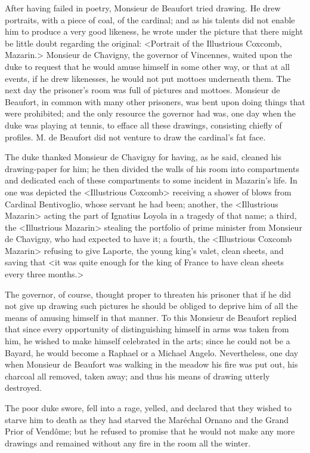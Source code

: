 After having failed in poetry, Monsieur de Beaufort tried drawing. He drew portraits, with a piece of coal, of the cardinal; and as his talents did not enable him to produce a very good likeness, he wrote under the picture that there might be little doubt regarding the original: <Portrait of the Illustrious Coxcomb, Mazarin.> Monsieur de Chavigny, the governor of Vincennes, waited upon the duke to request that he would amuse himself in some other way, or that at all events, if he drew likenesses, he would not put mottoes underneath them. The next day the prisoner's room was full of pictures and mottoes. Monsieur de Beaufort, in common with many other prisoners, was bent upon doing things that were prohibited; and the only resource the governor had was, one day when the duke was playing at tennis, to efface all these drawings, consisting chiefly of profiles. M. de Beaufort did not venture to draw the cardinal's fat face.

The duke thanked Monsieur de Chavigny for having, as he said, cleaned his drawing-paper for him; he then divided the walls of his room into compartments and dedicated each of these compartments to some incident in Mazarin's life. In one was depicted the <Illustrious Coxcomb> receiving a shower of blows from Cardinal Bentivoglio, whose servant he had been; another, the <Illustrious Mazarin> acting the part of Ignatius Loyola in a tragedy of that name; a third, the <Illustrious Mazarin> stealing the portfolio of prime minister from Monsieur de Chavigny, who had expected to have it; a fourth, the <Illustrious Coxcomb Mazarin> refusing to give Laporte, the young king's valet, clean sheets, and saving that <it was quite enough for the king of France to have clean sheets every three months.>

The governor, of course, thought proper to threaten his prisoner that if he did not give up drawing such pictures he should be obliged to deprive him of all the means of amusing himself in that manner. To this Monsieur de Beaufort replied that since every opportunity of distinguishing himself in arms was taken from him, he wished to make himself celebrated in the arts; since he could not be a Bayard, he would become a Raphael or a Michael Angelo. Nevertheless, one day when Monsieur de Beaufort was walking in the meadow his fire was put out, his charcoal all removed, taken away; and thus his means of drawing utterly destroyed.

The poor duke swore, fell into a rage, yelled, and declared that they wished to starve him to death as they had starved the Maréchal Ornano and the Grand Prior of Vendôme; but he refused to promise that he would not make any more drawings and remained without any fire in the room all the winter.

